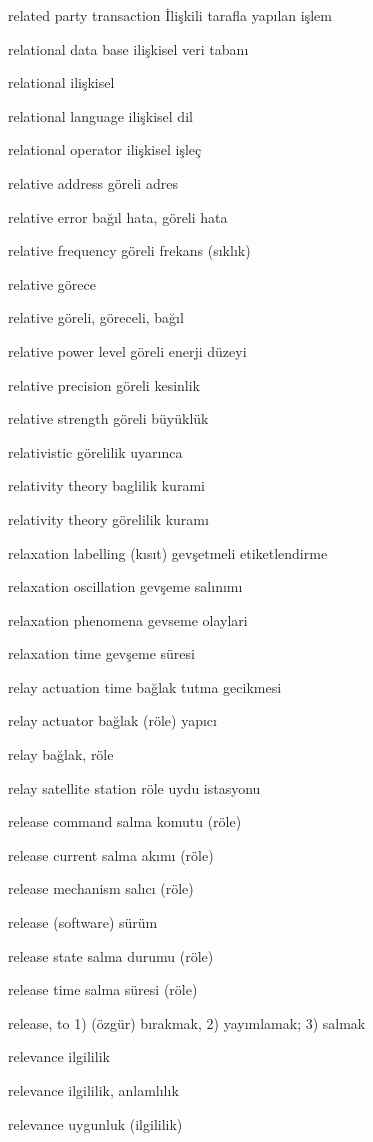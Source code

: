 \documentclass[12pt,fleqn]{article}\usepackage{../../common}
\begin{document}
related party transaction İlişkili tarafla yapılan işlem

relational data base ilişkisel veri tabanı

relational ilişkisel

relational language ilişkisel dil

relational operator ilişkisel işleç

relative address göreli adres

relative error bağıl hata, göreli hata

relative frequency göreli frekans (sıklık)

relative görece

relative göreli, göreceli, bağıl

relative power level göreli enerji düzeyi

relative precision göreli kesinlik

relative strength göreli büyüklük

relativistic görelilik uyarınca

relativity theory baglilik kurami

relativity theory görelilik kuramı

relaxation labelling (kısıt) gevşetmeli etiketlendirme

relaxation oscillation gevşeme salınımı

relaxation phenomena gevseme olaylari

relaxation time gevşeme süresi

relay actuation time bağlak tutma gecikmesi

relay actuator bağlak (röle) yapıcı

relay bağlak, röle

relay satellite station röle uydu istasyonu

release command salma komutu (röle)

release current salma akımı (röle)

release mechanism salıcı (röle)

release (software) sürüm

release state salma durumu (röle)

release time salma süresi (röle)

release, to 1) (özgür) bırakmak, 2) yayımlamak; 3) salmak

relevance ilgililik

relevance ilgililik, anlamlılık

relevance uygunluk (ilgililik)
\end{document}
